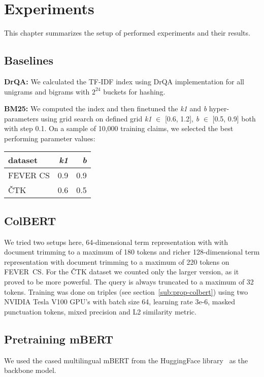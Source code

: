 \chapter{Experiments}
\label{chapter:experiments}
    This chapter summarizes the setup of performed experiments and their results.

\section{Baselines}
\label{sub:exp-baseline}
    \noindent \textbf{DrQA:} We calculated the TF-IDF index using DrQA implementation for all unigrams and bigrams with $2^{24}$ buckets for hashing.
    
    \noindent \textbf{BM25:} We computed the index and then finetuned the \emph{k1} and \emph{b} hyper-parameters using grid search on defined grid \emph{k1} $\in$ [0.6, 1.2], \emph{b} $\in$ [0.5, 0.9] both with step 0.1. On a sample of 10,000 training claims, we selected the best performing parameter values: 
    \begin{table}[H] \label{table:bm25-hyperpar}
        \centering
        \begin{tabular}{lrr}
            dataset     &  \emph{k1}   & \emph{b}  \\
        \midrule
            FEVER CS    &  0.9  & 0.9  \\
            ČTK         &  0.6  & 0.5  \\
        \end{tabular}
    \end{table}

\section{ColBERT}
\label{sub:exp-colbert}
    We tried two setups here, 64-dimensional term representation with with document trimming to a maximum of 180 tokens and richer 128-dimensional term representation with document trimming to a maximum of 220 tokens on FEVER~CS. For the ČTK dataset we counted only the larger version, as it proved to be more powerful. The query is always truncated to a maximum of 32 tokens. 
    Training was done on triples (see section~\ref{sub:prop-colbert}) using two NVIDIA Tesla V100 GPU's with batch size 64, learning rate 3e-6, masked punctuation tokens, mixed precision and L2 similarity metric. %

\section{Pretraining mBERT}
\label{sub:exp-pretrained}
    We used the cased multilingual mBERT from the HuggingFace library~\parencite{wolf-etal-2020-transformers} as the backbone model.

